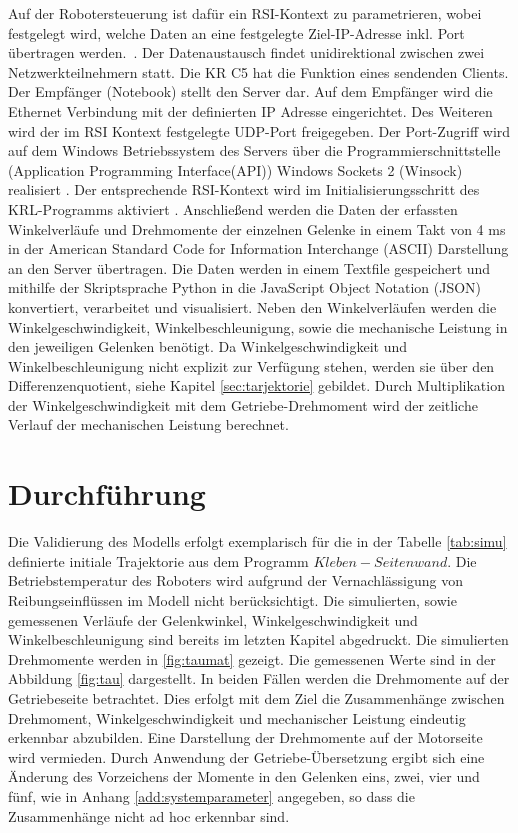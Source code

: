 %
Auf der Robotersteuerung ist daf{\"u}r ein RSI-Kontext zu parametrieren, wobei festgelegt wird, welche Daten an eine festgelegte Ziel-IP-Adresse inkl. Port {\"u}bertragen werden.~\cite[S.~43]{RSI.2020}.  Der Datenaustausch findet unidirektional zwischen zwei Netzwerkteilnehmern statt. Die KR C5 hat die Funktion eines sendenden Clients. Der Empfänger (Notebook) stellt den Server dar. Auf dem Empfänger wird die Ethernet Verbindung mit der definierten IP Adresse eingerichtet. Des Weiteren wird der im RSI Kontext festgelegte UDP-Port freigegeben. Der Port-Zugriff wird auf dem Windows Betriebssystem des Servers über die Programmierschnittstelle (Application Programming Interface(API)) Windows Sockets 2 (Winsock) realisiert \cite{Winsock.2023}. 
%
Der entsprechende RSI-Kontext wird im Initialisierungsschritt des KRL-Programms aktiviert \cite[S.~50]{RSI.2020}. Anschließend werden die Daten der erfassten Winkelverläufe und Drehmomente der einzelnen Gelenke in einem Takt von 4 ms in der American Standard Code for Information Interchange (ASCII) Darstellung an den Server übertragen. Die Daten werden in einem Textfile gespeichert und mithilfe der Skriptsprache Python in die JavaScript Object Notation (JSON) konvertiert, verarbeitet und visualisiert. 
%
Neben den Winkelverläufen werden die Winkelgeschwindigkeit, Winkelbeschleunigung, sowie die mechanische Leistung in den jeweiligen Gelenken benötigt. Da Winkelgeschwindigkeit und Winkelbeschleunigung nicht explizit zur Verfügung stehen, werden sie über den Differenzenquotient, siehe Kapitel \ref{sec:tarjektorie} gebildet. Durch Multiplikation der Winkelgeschwindigkeit mit dem Getriebe-Drehmoment wird der zeitliche Verlauf der mechanischen Leistung berechnet.

\section{Durchführung}
Die Validierung des Modells erfolgt exemplarisch für die in der Tabelle \ref{tab:simu} definierte initiale Trajektorie aus dem Programm $Kleben-Seitenwand$. Die Betriebstemperatur des Roboters wird aufgrund der Vernachlässigung von Reibungseinflüssen im Modell nicht berücksichtigt. Die simulierten, sowie gemessenen Verläufe der Gelenkwinkel, Winkelgeschwindigkeit und Winkelbeschleunigung sind bereits im letzten Kapitel abgedruckt. Die simulierten Drehmomente werden in \ref{fig:taumat} gezeigt. Die gemessenen Werte sind in der Abbildung \ref{fig:tau} dargestellt. In beiden Fällen werden die Drehmomente auf der Getriebeseite betrachtet. Dies erfolgt mit dem Ziel die Zusammenhänge zwischen Drehmoment, Winkelgeschwindigkeit und mechanischer Leistung eindeutig erkennbar abzubilden. Eine Darstellung der Drehmomente auf der Motorseite wird vermieden. Durch Anwendung der Getriebe-Übersetzung ergibt sich eine Änderung des Vorzeichens der Momente in den Gelenken eins, zwei, vier und fünf, wie in Anhang \ref{add:systemparameter} angegeben, so dass die Zusammenhänge nicht ad hoc erkennbar sind.

